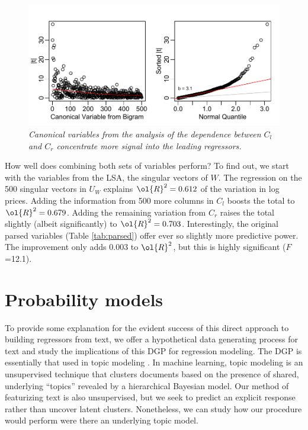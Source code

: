 \documentclass[12pt]{article}
\begin{document}
 \begin{figure}
 \caption{ \label{fig:regrBcca} { \sl Canonical variables from the analysis of the dependence between $C_l$ and $C_r$ concentrate more signal into the leading regressors.}}

 \centerline{
 \vspace{0.1in}
 \includegraphics[width=5in]{figures/regrBcca}  }
 \vspace{0.2in}
 \end{figure}


How well does combining both sets of variables perform?  To find out, we start with the variables from the LSA, the singular vectors of $W$.   The regression on the 500 singular vectors in $U_W$ explains $\ol{R}^2 = 0.612$ of the variation in log prices.  Adding the information from 500 more columns in $C_l$ boosts the total to $\ol{R}^2 = 0.679$.  Adding the remaining variation from $C_r$ raises the total slightly (albeit significantly) to $\ol{R}^2 = 0.703$. Interestingly,  the original parsed variables (Table \ref{tab:parsed}) offer ever so slightly more predictive power. The improvement only adds 0.003 to $\ol{R}^2$, but this is highly significant ($F$=12.1).


\section{Probability models}
\label{sec:topic}

 To provide some explanation for the evident success of this direct approach to building regressors from text, we offer a hypothetical data generating process for text and study the implications of this DGP for regression modeling.  The DGP is essentially that used in topic modeling \citep{blei12}.  In machine learning, topic modeling is an unsupervised technique that  clusters documents based on the presence of shared, underlying ``topics'' revealed by a hierarchical Bayesian  model.  Our method of featurizing text is also unsupervised,  but we seek to predict an explicit response rather than uncover latent clusters.  Nonetheless, we can study how our procedure would perform were there an underlying topic model.
\end{document}
